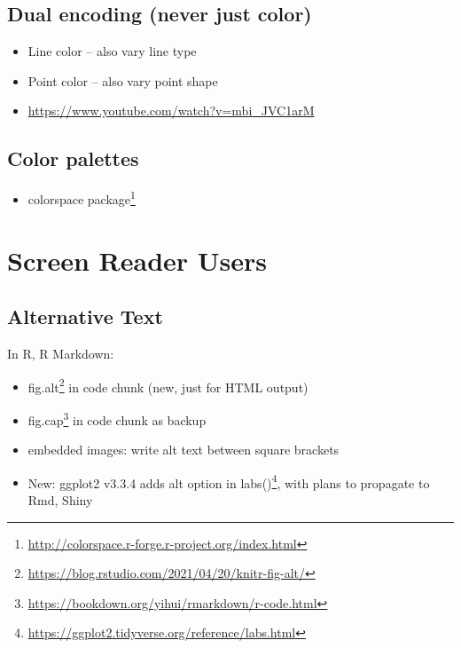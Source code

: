 \documentclass[
]{krantz}
\providecommand{\tightlist}{%
  \setlength{\itemsep}{0pt}\setlength{\parskip}{0pt}}
\renewcommand{\href}[2]{#2\footnote{\url{#1}}}
\begin{document}
\hypertarget{dual-encoding-never-just-color}{%
\subsection{Dual encoding (never just color)}\label{dual-encoding-never-just-color}}

\begin{itemize}
\item
  Line color -- also vary line type
\item
  Point color -- also vary point shape
\item
  \url{https://www.youtube.com/watch?v=mbi_JVC1arM}
\end{itemize}

\hypertarget{color-palettes}{%
\subsection{Color palettes}\label{color-palettes}}

\begin{itemize}
\tightlist
\item
  \href{http://colorspace.r-forge.r-project.org/index.html}{colorspace package}
\end{itemize}

\hypertarget{screen-reader-users}{%
\section{Screen Reader Users}\label{screen-reader-users}}

\hypertarget{alternative-text}{%
\subsection{Alternative Text}\label{alternative-text}}

In R, R Markdown:

\begin{itemize}
\item
  \href{https://blog.rstudio.com/2021/04/20/knitr-fig-alt/}{fig.alt} in code chunk (new, just for HTML output)
\item
  \href{https://bookdown.org/yihui/rmarkdown/r-code.html}{fig.cap} in code chunk as backup
\item
  embedded images: write alt text between square brackets
\item
  New: ggplot2 v3.3.4 adds \href{https://ggplot2.tidyverse.org/reference/labs.html}{alt option in labs()}, with plans to propagate to Rmd, Shiny
\end{itemize}
\end{document}
